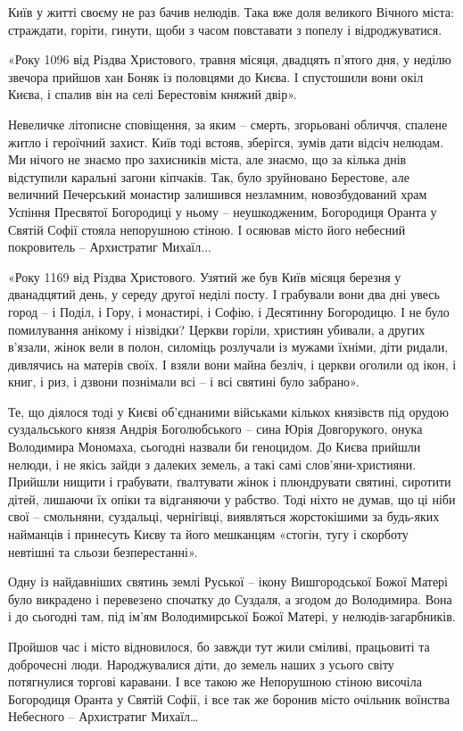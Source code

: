 Київ у житті своєму не раз бачив нелюдів. Така вже доля великого Вічного міста:
страждати, горіти, гинути, щоби з часом повставати з попелу і  відроджуватися.

«Року 1096 від Різдва Христового, травня місяця, двадцять п’ятого дня, у неділю
звечора прийшов хан Боняк із половцями до Києва. І спустошили вони окіл Києва,
і спалив він на селі Берестовім княжий двір».

Невеличке літописне сповіщення, за яким  -- смерть, згорьовані обличчя, спалене
житло і героїчний захист. Київ тоді встояв, зберігся, зумів дати відсіч
нелюдам. Ми нічого не знаємо про захисників міста, але знаємо, що за кілька
днів відступили каральні загони кіпчаків. Так, було зруйновано Берестове, але
величний Печерський монастир залишився незламним, новозбудований храм Успіння
Пресвятої Богородиці у ньому – неушкодженим, Богородиця Оранта у Святій Софії
стояла непорушною стіною. І осяював місто його небесний покровитель –
Архистратиг Михаїл...

«Року 1169 від Різдва Христового. Узятий же був Київ місяця березня у
дванадцятий день, у середу другої неділі посту. І грабували вони два дні увесь
город – і Поділ, і Гору, і монастирі, і Софію, і Десятинну Богородицю. І не
було помилування анікому і нізвідки? Церкви горіли, християн убивали, а других
в’язали, жінок вели в полон, силоміць розлучали із мужами їхніми, діти ридали,
дивлячись на матерів своїх. І взяли вони майна безліч, і церкви оголили од
ікон, і книг, і риз, і дзвони познімали всі – і всі святині було забрано».

Те, що діялося тоді у Києві об’єднаними військами кількох князівств під орудою
суздальського князя Андрія Боголюбського -- сина Юрія Довгорукого, онука
Володимира Мономаха, сьогодні назвали би геноцидом. До Києва прийшли нелюди, і
не якісь зайди з далеких земель, а такі самі слов’яни-християни. Прийшли нищити
і грабувати, ґвалтувати жінок  і плюндрувати святині, сиротити дітей, лишаючи
їх опіки та відганяючи у рабство. Тоді ніхто не думав, що ці ніби свої –
смольняни, суздальці, чернігівці, виявляться жорстокішими за будь-яких
найманців і принесуть Києву та його мешканцям «стогін, тугу і скорботу невтішні
та сльози безперестанні».

Одну із найдавніших святинь землі Руської – ікону Вишгородської Божої Матері
було викрадено і перевезено спочатку до Суздаля, а згодом до Володимира. Вона і
до сьогодні там, під ім’ям Володимирської Божої Матері, у нелюдів-загарбників.

Пройшов час і місто відновилося, бо завжди тут жили сміливі, працьовиті та
доброчесні люди. Народжувалися діти, до земель наших з усього світу потягнулися
торгові каравани. І все такою же Непорушною стіною височіла Богородиця Оранта у
Святій Софії, і все так же боронив місто очільник воїнства Небесного –
Архистратиг Михаїл…

